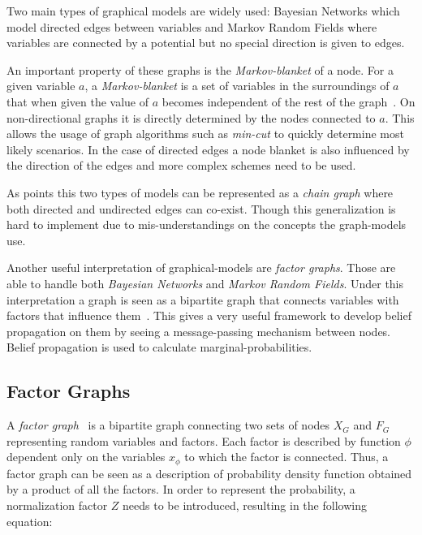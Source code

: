 Two main types of graphical models are widely used: Bayesian Networks which model
directed edges between variables and Markov Random Fields where variables are
connected by a potential but no special direction is given to edges.

An important property of these graphs is the \emph{Markov-blanket} of a node.
For a given variable $a$, a \emph{Markov-blanket} is a set of variables in the
surroundings of $a$ that when given the value of $a$ becomes independent of the
rest of the graph~\citep{pearl1988probabilistic}.
On non-directional graphs it is directly determined by the nodes connected to $a$.
This allows the usage of graph algorithms such as \emph{min-cut} to quickly
determine most likely scenarios. In the case of directed edges a node blanket is
also influenced by the direction of the edges and more complex schemes need to
be used.

As \cite{lauritzen2002chain} points this two types of models can be represented
as a \emph{chain graph} where both directed and undirected edges can co-exist.
Though this generalization is hard to implement due to mis-understandings on the
concepts the graph-models use.

Another useful interpretation of graphical-models are \emph{factor graphs}.
Those are able to handle both \emph{Bayesian Networks} and
\emph{Markov Random Fields}. Under this interpretation a graph is seen as a
bipartite graph that connects variables with factors that influence
them~\citep{bishop2006pattern}.
This gives a very useful framework to develop belief propagation on them by
seeing a message-passing mechanism between nodes. Belief propagation is used to
calculate marginal-probabilities.

\begin{figure}[ht]
\centering

\quad
{}
\quad
{}
\end{figure}

\subsection{Factor Graphs}
A \emph{factor graph}~\cite{kschischang2001factor} is a bipartite graph connecting two sets of nodes $X_G$ and $F_G$
representing random variables and factors.
Each factor is described by function $\phi$ dependent only on the variables $x_\phi$
to which the factor is connected.
Thus, a factor graph can be seen as a description of probability density function obtained
by a product of all the factors. In order to represent the probability,
a normalization factor $Z$ needs to be introduced, resulting in the following equation:

